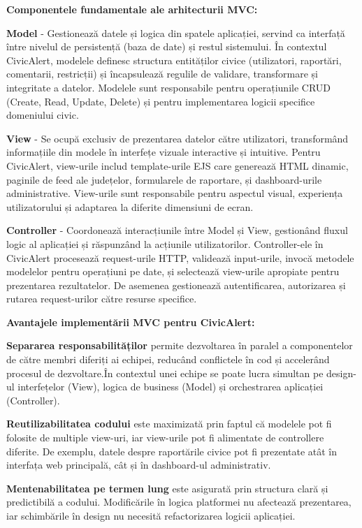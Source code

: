 \documentclass[12pt,a4paper]{report}
\begin{document}
\textbf{Componentele fundamentale ale arhitecturii MVC:}

\textbf{Model} - Gestionează datele și logica din spatele aplicației, servind ca interfață între nivelul de persistență (baza de date) și restul sistemului. În contextul CivicAlert, modelele definesc structura entităților civice (utilizatori, raportări, comentarii, restricții) și încapsulează regulile de validare, transformare și integritate a datelor. Modelele sunt responsabile pentru operațiunile CRUD (Create, Read, Update, Delete) și pentru implementarea logicii specifice domeniului civic.

\textbf{View} - Se ocupă exclusiv de prezentarea datelor către utilizatori, transformând informațiile din modele în interfețe vizuale interactive și intuitive. Pentru CivicAlert, view-urile includ template-urile EJS care generează HTML dinamic, paginile de feed ale județelor, formularele de raportare, și dashboard-urile administrative. View-urile sunt responsabile pentru aspectul visual, experiența utilizatorului și adaptarea la diferite dimensiuni de ecran.

\textbf{Controller} - Coordonează interacțiunile între Model și View, gestionând fluxul logic al aplicației și răspunzând la acțiunile utilizatorilor. Controller-ele în CivicAlert procesează request-urile HTTP, validează input-urile, invocă metodele modelelor pentru operațiuni pe date, și selectează view-urile apropiate pentru prezentarea rezultatelor. De asemenea gestionează autentificarea, autorizarea și rutarea request-urilor către resurse specifice.

\textbf{Avantajele implementării MVC pentru CivicAlert:}

\textbf{Separarea responsabilităților} permite dezvoltarea în paralel a componentelor de către membri diferiți ai echipei, reducând conflictele în cod și accelerând procesul de dezvoltare.În contextul unei echipe se  poate lucra simultan pe design-ul interfețelor (View), logica de business (Model) și orchestrarea aplicației (Controller).

\textbf{Reutilizabilitatea codului} este maximizată prin faptul că modelele pot fi folosite de multiple view-uri, iar view-urile pot fi alimentate de controllere diferite. De exemplu, datele despre raportările civice pot fi prezentate atât în interfața web principală, cât și în dashboard-ul administrativ.

\textbf{Mentenabilitatea pe termen lung} este asigurată prin structura clară și predictibilă a codului. Modificările în logica platformei nu afectează prezentarea, iar schimbările în design nu necesită refactorizarea logicii aplicației.
\end{document}
